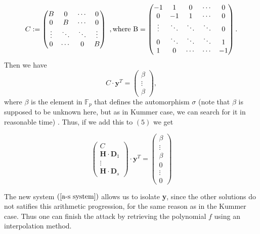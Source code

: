 \documentclass[10pt]{article}
\newcommand{\cd}{\cdot}
\begin{document}
\begin{equation*} 
C := 
\begin{pmatrix}
B & 0 & \cdots & 0 \\
0 & B & \cdots & 0 \\
\vdots & \ddots & \ddots & \vdots \\
0 & \cdots & 0 & B
\end{pmatrix} \ , \rm where  \ 
B = 
\begin{pmatrix}
-1 & 1 & 0 & \cdots & 0 \\
0 & -1 & 1 & \cdots & 0 \\
\vdots & \ddots & \ddots & \ddots & 0 \\
0 & \ddots & \ddots & \ddots & 1 \\
1 & 0 & \cdots & \cdots & -1
\end{pmatrix}.
\end{equation*}
 Then we have
\begin{equation*}
C \cd \textbf{y}^T
= 
\begin{pmatrix}
\beta \\
\vdots \\
\beta
\end{pmatrix},
\end{equation*}
where $\beta$ is the element in $\mathbb{F}_p$ that defines the automorphism $\sigma$ (note that $\beta$ is supposed to be unknown here, but as in Kummer case, we can search for it in reasonable time) . Thus, if we add this to $(5)$ we get

\begin{equation} \label{a-s system}
\begin{pmatrix}
C\\
\mathbf{H} \cd \textbf{D}_1 \\
\vdots \\
\mathbf{H} \cd \textbf{D}_s
\end{pmatrix}
\cd \textbf{y}^T = 
\begin{pmatrix}
\beta \\
\vdots \\
\beta \\
0 \\
\vdots \\
0
\end{pmatrix} 
\end{equation}

The new system $(\ref{a-s system})$ allows us to isolate \textbf{y}, since the other solutions do not satifies this arithmetic progression, for the same reason as in the Kummer case. Thus one can finish the attack by retrieving the polynomial $f$ using an interpolation method. 
\end{document}
